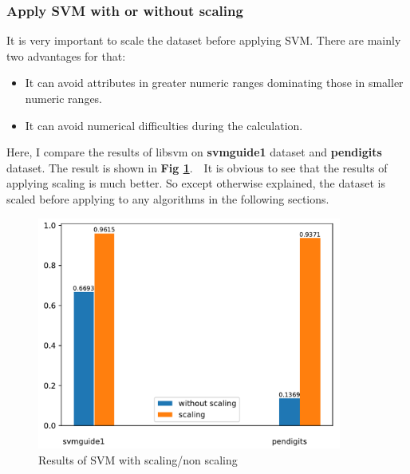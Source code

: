\documentclass{article}
\theoremstyle{definition}
\numberwithin{equation}{section}
\numberwithin{figure}{section}
\begin{document}
\subsubsection{Apply SVM with or without scaling}
It is very important to scale the dataset before applying SVM. There are mainly two advantages for that:
 \begin{itemize}
 \item  It can avoid attributes in greater numeric
 ranges dominating those in smaller numeric ranges.
 \item It can avoid
 numerical difficulties during the calculation. 
 \end{itemize}
 Here, I compare the results of libsvm on \textbf{svmguide1} dataset and \textbf{pendigits} dataset. The result is shown in \textbf{Fig \ref{scale}}.　It is obvious to see that the results of applying scaling is much better. So except otherwise explained, the dataset is scaled before applying to any algorithms in the following sections.
 
 \begin{figure}[htbp]
 	\centering
 	\includegraphics[width=10cm]{fig/scale.png}
 \caption{Results of SVM with scaling/non scaling}
 \label{scale}
 \end{figure}
\end{document}
